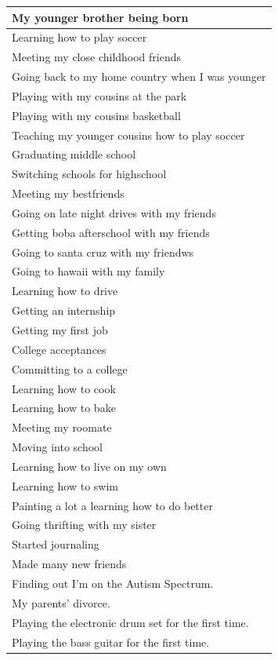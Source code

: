 \documentclass[
  .7em,
  letterpaper,
  DIV=11,
  numbers=noendperiod]{scrartcl}
\begin{document}
\begin{table}
\begin{tabular}{l}
\hline
My younger brother being born\\
\hline
Learning how to play soccer\\
\hline
Meeting my close childhood friends\\
\hline
Going back to my home country when I was younger\\
\hline
Playing with my cousins at the park\\
\hline
Playing with my cousins basketball\\
\hline
Teaching my younger cousins how to play soccer\\
\hline
Graduating middle school\\
\hline
Switching schools for highschool\\
\hline
Meeting my bestfriends\\
\hline
Going on late night drives with my friends\\
\hline
Getting boba afterschool with my friends\\
\hline
Going to santa cruz with my friendws\\
\hline
Going to hawaii with my family\\
\hline
Learning how to drive\\
\hline
Getting an internship\\
\hline
Getting my first job\\
\hline
College acceptances\\
\hline
Committing to a college\\
\hline
Learning how to cook\\
\hline
Learning how to bake\\
\hline
Meeting my roomate\\
\hline
Moving into school\\
\hline
Learning how to live on my own\\
\hline
Learning how to swim\\
\hline
Painting a lot a learning how to do better\\
\hline
Going thrifting with my sister\\
\hline
Started journaling\\
\hline
Made many new friends\\
\hline
Finding out I'm on the Autism Spectrum.\\
\hline
My parents' divorce.\\
\hline
Playing the electronic drum set for the first time.\\
\hline
Playing the bass guitar for the first time.\\

\end{tabular}
\end{table}
\end{document}

